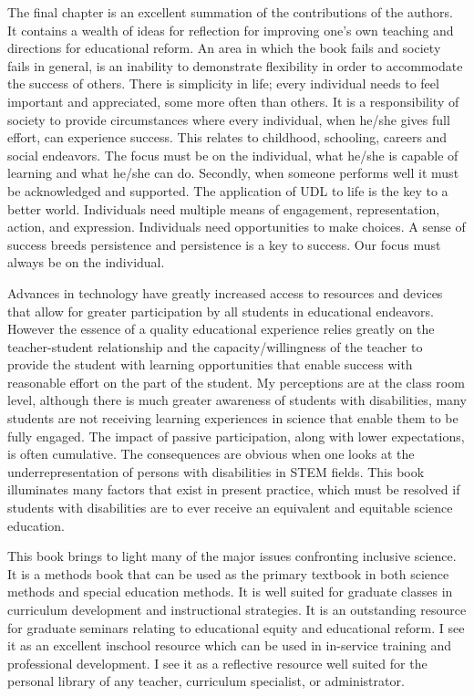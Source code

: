 \documentclass[11.5pt]{sig-alternate} %
\begin{document}
\begin{large}
The final chapter is an excellent summation of the contributions of the authors.  It contains a wealth of ideas for reflection for improving one’s own teaching and directions for educational reform.  An area in which the book fails and society fails in general, is an inability to demonstrate flexibility in order to accommodate the success of others. There is simplicity in life; every individual needs to feel important and appreciated, some more often than others.  It is a responsibility of society to provide circumstances where every individual, when he/she gives full effort, can experience success.  This relates to childhood, schooling, careers and social endeavors.  The focus must be on the individual, what he/she is capable of learning and what he/she can do.  Secondly, when someone performs well it must be acknowledged and supported. The application of UDL to life is the key to a better world. Individuals need multiple means of engagement, representation, action, and expression.  Individuals need opportunities to make choices. A sense of success breeds persistence and persistence is a key to success.  Our focus must always be on the individual.

Advances in technology have greatly increased access to resources and devices that allow for greater participation by all students in educational endeavors.  However the essence of a quality educational experience relies greatly on the teacher-student relationship and the capacity/willingness of the teacher to provide the student with learning opportunities that enable success with reasonable effort on the part of the student. My perceptions are at the class room level, although there is much greater awareness of students with disabilities, many students are not receiving learning experiences in science that enable them to be fully engaged.  The impact of passive participation, along with lower expectations, is often cumulative. The consequences are obvious when one looks at the underrepresentation of persons with disabilities in STEM fields. This book illuminates many factors that exist in present practice, which must be resolved if students with disabilities are to ever receive an equivalent and equitable science education.

This book brings to light many of the major issues confronting inclusive science.  It is a methods book that can be used as the primary textbook in both science methods and special education methods. It is well suited for graduate classes in curriculum development and instructional strategies.  It is an outstanding resource for graduate seminars relating to educational equity and educational reform. I see it as an excellent inschool resource which can be used in in-service training and professional development. I see it as a reflective resource well suited for the personal library of any teacher, curriculum specialist, or administrator.


\end{large}
\end{document}

